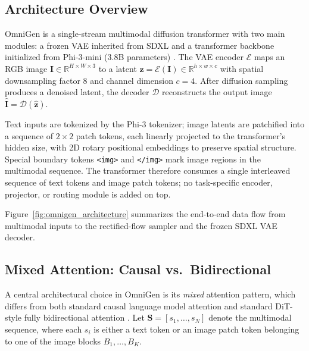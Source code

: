 \documentclass[conference]{IEEEtran}
\begin{document}
\subsection{Architecture Overview}
OmniGen is a single-stream multimodal diffusion transformer with two main modules: a frozen VAE inherited from SDXL \cite{podell2023sdxl} and a transformer backbone initialized from Phi-3-mini (3.8B parameters) \cite{phi3}. The VAE encoder $\mathcal{E}$ maps an RGB image $\mathbf{I}\in\mathbb{R}^{H\times W\times 3}$ to a latent $\mathbf{z}=\mathcal{E}(\mathbf{I})\in\mathbb{R}^{h\times w\times c}$ with spatial downsampling factor $8$ and channel dimension $c=4$. After diffusion sampling produces a denoised latent, the decoder $\mathcal{D}$ reconstructs the output image $\hat{\mathbf{I}}=\mathcal{D}(\hat{\mathbf{z}})$.

Text inputs are tokenized by the Phi-3 tokenizer; image latents are patchified into a sequence of $2\times 2$ patch tokens, each linearly projected to the transformer's hidden size, with 2D rotary positional embeddings to preserve spatial structure. Special boundary tokens \texttt{<img>} and \texttt{</img>} mark image regions in the multimodal sequence. The transformer therefore consumes a single interleaved sequence of text tokens and image patch tokens; no task-specific encoder, projector, or routing module is added on top.

Figure~\ref{fig:omnigen_architecture} summarizes the end-to-end data flow from multimodal inputs to the rectified-flow sampler and the frozen SDXL VAE decoder.



\subsection{Mixed Attention: Causal vs.\ Bidirectional}
A central architectural choice in OmniGen \cite{omnigen2024} is its \emph{mixed} attention pattern, which differs from both standard causal language model attention and standard DiT-style fully bidirectional attention \cite{peebles2023scalable}. Let $\mathbf{S}=[s_1,\ldots,s_N]$ denote the multimodal sequence, where each $s_i$ is either a text token or an image patch token belonging to one of the image blocks $B_1,\ldots,B_K$.
\end{document}
